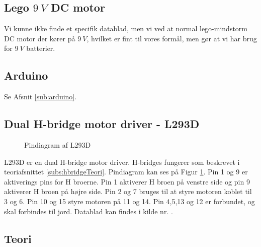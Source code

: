 \subsection{Lego $\SI{9}{V}$ DC motor}
Vi kunne ikke finde et specifik datablad, men vi ved at normal lego-mindstorm DC motor der kører på $\SI{9}{V}$, hvilket er fint til vores formål, men gør at vi har brug for $\SI{9}{V}$ batterier.

\subsection{Arduino}
Se Afsnit \ref{sub:arduino}.

\subsection{Dual H-bridge motor driver - L293D}

		\begin{figure}[H] \label{fig:pindiagramL293D}
			\centering 
			\caption{Pindiagram af L293D}
		\end{figure}
	L293D er en dual H-bridge motor driver. H-bridges fungerer som beskrevet i teoriafsnittet \ref{subs:hbridgeTeori}.
	Pindiagram kan ses på Figur \ref{fig:pindiagramL293D}. Pin 1 og 9 er aktiverings pins for H broerne. Pin 1 aktiverer H broen på venstre side og pin 9 aktiverer H broen på højre side. Pin 2 og 7 bruges til at styre motoren koblet til 3 og 6. Pin 10 og 15 styre motoren på 11 og 14. Pin 4,5,13 og 12 er forbundet, og skal forbindes til jord. Datablad kan findes i kilde nr. \cite{komphbridge}.
\subsection{Teori}
